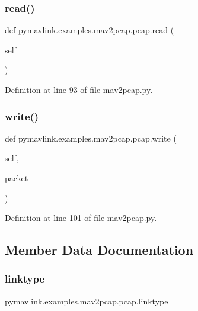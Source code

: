 \subsubsection{\texorpdfstring{read()}{read()}}
{\footnotesize\ttfamily def pymavlink.\+examples.\+mav2pcap.\+pcap.\+read (\begin{DoxyParamCaption}\item[{}]{self }\end{DoxyParamCaption})}



Definition at line 93 of file mav2pcap.\+py.

\mbox{\label{classpymavlink_1_1examples_1_1mav2pcap_1_1pcap_adfb468dd44dd0a2d50a9357813438a64}} 
\subsubsection{\texorpdfstring{write()}{write()}}
{\footnotesize\ttfamily def pymavlink.\+examples.\+mav2pcap.\+pcap.\+write (\begin{DoxyParamCaption}\item[{}]{self,  }\item[{}]{packet }\end{DoxyParamCaption})}



Definition at line 101 of file mav2pcap.\+py.



\subsection{Member Data Documentation}
\mbox{\label{classpymavlink_1_1examples_1_1mav2pcap_1_1pcap_a813b36d754099808dced606c51cbf037}} 
\subsubsection{\texorpdfstring{linktype}{linktype}}
{\footnotesize\ttfamily pymavlink.\+examples.\+mav2pcap.\+pcap.\+linktype}



